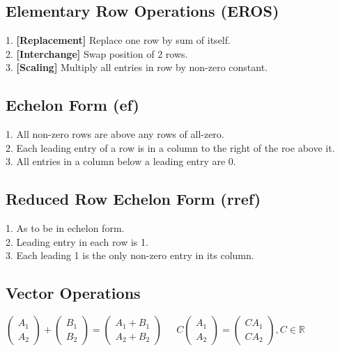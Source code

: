 \documentclass[5pt]{article}
\begin{document}
\begin{multicols}{2}
\subsection{Elementary Row Operations (EROS)}
1. \textbf{[Replacement]} Replace one row by sum of itself. \\
2. \textbf{[Interchange]} Swap position of 2 rows. \\
3. \textbf{[Scaling]} Multiply all entries in row by non-zero constant. \\


\subsection{Echelon Form (ef)}
1. All non-zero rows are above any rows of all-zero. \\
2. Each leading entry of a row is in a column to the right of the roe above it. \\
3. All entries in a column below a leading entry are 0. \\


\subsection{Reduced Row Echelon Form (rref)}
1. As to be in echelon form. \\
2. Leading entry in each row is 1. \\
3. Each leading 1 is the only non-zero entry in its column. \\

\subsection{Vector Operations}
\small{
$\begin{pmatrix}A_1\\ A_2\end{pmatrix}+\begin{pmatrix}B_1\\ B_2\end{pmatrix}=\begin{pmatrix}A_1+B_1\\ A_2+B_2\end{pmatrix}\;\;\;\;$
$C\begin{pmatrix}A_1\\ A_2\end{pmatrix}=\begin{pmatrix}CA_1\\ CA_2\end{pmatrix}, C\in\mathbb{R}$}


\end{multicols}
\end{document}
